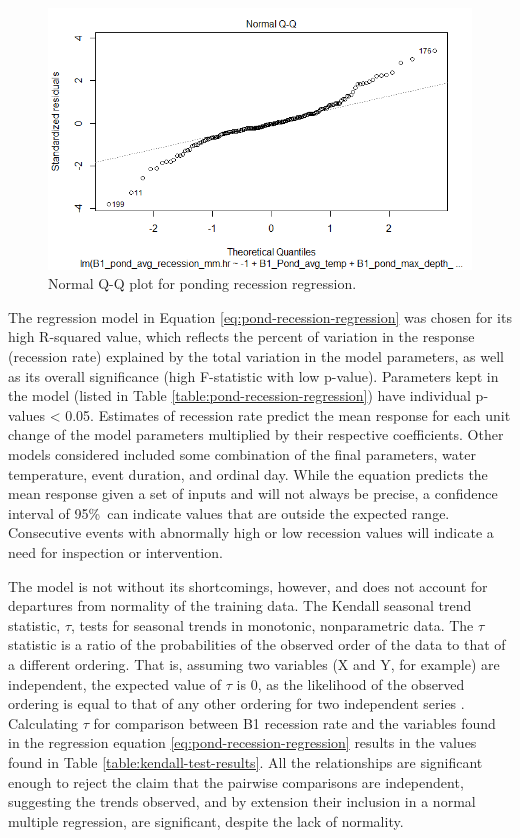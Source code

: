 \begin{figure}[ht!]
	\centering
	\includegraphics[width=\textwidth]{gfx/chapter-data-analysis/pond_recession_regression_normal_qq.png}
	\caption{Normal Q-Q plot for ponding recession regression.}
	\label{fig:pond-recession-regression-normal-qq}
\end{figure}

The regression model in Equation \ref{eq:pond-recession-regression} was chosen for its high R-squared value, which reflects the percent of variation in the response (recession rate) explained by the total variation in the model parameters, as well as its overall significance (high F-statistic with low p-value).
Parameters kept in the model (listed in Table \ref{table:pond-recession-regression}) have individual p-values < 0.05.
Estimates of recession rate predict the mean response for each unit change of the model parameters multiplied by their respective coefficients.
Other models considered included some combination of the final parameters, water temperature, event duration, and ordinal day.
While the equation predicts the mean response given a set of inputs and will not always be precise, a confidence interval of 95\%\ can indicate values that are outside the expected range.
Consecutive events with abnormally high or low recession values will indicate a need for inspection or intervention.

The model is not without its shortcomings, however, and does not account for departures from normality of the training data.
The Kendall seasonal trend statistic, $\tau$, tests for seasonal trends in monotonic, nonparametric data.
The $\tau$ statistic is a ratio of the probabilities of the observed order of the data to that of a different ordering.
That is, assuming two variables (X and Y, for example) are independent, the expected value of $\tau$ is 0, as the likelihood of the observed ordering is equal to that of any other ordering for two independent series \cite{Abdi2007}.
Calculating $\tau$ for comparison between B1 recession rate and the variables found in the regression equation \ref{eq:pond-recession-regression} results in the values found in Table \ref{table:kendall-test-results}.
All the relationships are significant enough to reject the claim that the pairwise comparisons are independent, suggesting the trends observed, and by extension their inclusion in a normal multiple regression, are significant, despite the lack of normality.

